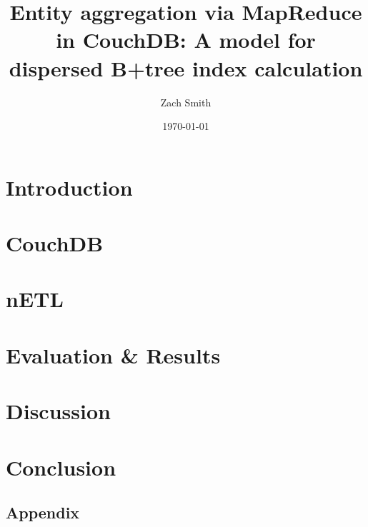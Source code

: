 \documentclass[
    parskip=full,
    a4paper
]{scrartcl}
\title{Entity aggregation via MapReduce in CouchDB: A model for dispersed B+tree index calculation}
\author{Zach Smith}
\date{\today}
\begin{document}
\maketitle
\thispagestyle{empty}

\begin{abstract}
    
\end{abstract}
\newpage

\tableofcontents
\newpage

\section{Introduction}




\section{CouchDB}



\section{nETL}




\section{Evaluation \& Results}




\section{Discussion}


\section{Conclusion}



\newpage




\begin{appendix}
    \section{Appendix}
    
    
    
    
    \listoffigures
    \listoftables
\end{appendix}
\newpage

\end{document}
